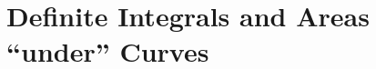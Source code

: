 \documentclass[11pt,fleqn]{article}
\begin{document}
\setlength{\parindent}{0cm}
\renewcommand{\headrulewidth}{0pt}
\newcommand{\blank}[1]{\rule{#1}{0.75pt}}
\renewcommand{\d}{\displaystyle}
\vspace*{-0.7in}
\begin{center}
 {\large{ }}
 \end{center}

\section*{Definite Integrals and Areas ``under'' Curves}
\end{document}
